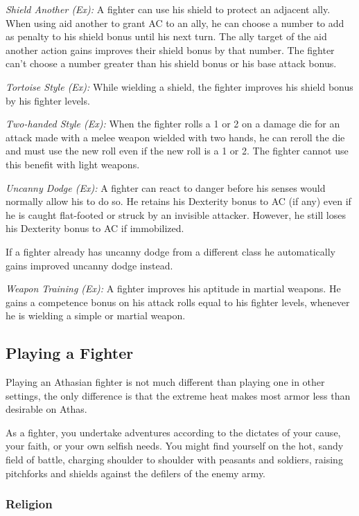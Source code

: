 \textit{Shield Another (Ex):} A fighter can use his shield to protect an adjacent ally. When using aid another to grant AC to an ally, he can choose a number to add as penalty to his shield bonus until his next turn. The ally target of the aid another action gains improves their shield bonus by that number. The fighter can't choose a number greater than his shield bonus or his base attack bonus.

\textit{Tortoise Style (Ex):} While wielding a shield, the fighter improves his shield bonus by \onequarter his fighter levels.

\textit{Two-handed Style (Ex):} When the fighter rolls a 1 or 2 on a damage die for an attack made with a melee weapon wielded with two hands, he can reroll the die and must use the new roll even if the new roll is a 1 or 2. The fighter cannot use this benefit with light weapons.

\textit{Uncanny Dodge (Ex):} A fighter can react to danger before his senses would normally allow his to do so. He retains his Dexterity bonus to AC (if any) even if he is caught flat-footed or struck by an invisible attacker. However, he still loses his Dexterity bonus to AC if immobilized.

If a fighter already has uncanny dodge from a different class he automatically gains improved uncanny dodge instead.

\textit{Weapon Training (Ex):} A fighter improves his aptitude in martial weapons. He gains a competence bonus on his attack rolls equal to \onequarter his fighter levels, whenever he is wielding a simple or martial weapon.

\subsection{Playing a Fighter}
Playing an Athasian fighter is not much different than playing one in other settings, the only difference is that the extreme heat makes most armor less than desirable on Athas.

As a fighter, you undertake adventures according to the dictates of your cause, your faith, or your own selfish needs. You might find yourself on the hot, sandy field of battle, charging shoulder to shoulder with peasants and soldiers, raising pitchforks and shields against the defilers of the enemy army.

\subsubsection{Religion}

